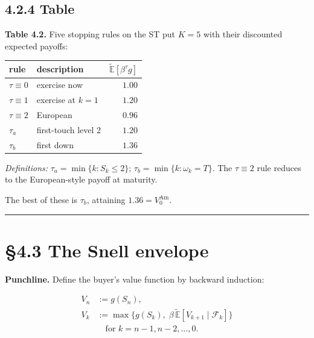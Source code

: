 \documentclass[
  10pt,
  twoside]{book}
\newcounter{none} %
\begin{document}
\subsection{4.2.4 Table}\label{table-17}

\textbf{Table 4.2.} Five stopping rules on the ST put \(K=5\) with their
discounted expected payoffs:

{\def\LTcaptype{none} %
\begin{table}[H]
\centering
\begin{tabular}{|l|l|r|}
\toprule
rule & description & \(\tilde{\mathbb{E}}[\beta^\tau g]\) \\
\midrule



\(\tau \equiv 0\) & exercise now & \(1.00\) \\
\(\tau \equiv 1\) & exercise at \(k=1\) & \(1.20\) \\
\(\tau \equiv 2\) & European & \(0.96\) \\
\(\tau_a\) & first-touch level 2 & \(1.20\) \\
\(\tau_b\) & first down & \textbf{\(1.36\)} \\
\bottomrule
\end{tabular}
\end{table}
}

\emph{Definitions:} \(\tau_a = \min\{k : S_k \le 2\}\);
\(\tau_b = \min\{k : \omega_k = T\}\). The \(\tau \equiv 2\) rule
reduces to the European-style payoff at maturity.

The best of these is \(\tau_b\), attaining \(1.36 = V_0^{\text{Am}}\).

\begin{center}\rule{0.5\linewidth}{0.5pt}\end{center}

\section{§4.3 The Snell envelope}\label{the-snell-envelope}

\textbf{Punchline.} Define the buyer's value function by backward
induction:

\[\boxed{\;\begin{aligned}
V_n &:= g(S_n), \\
V_k &:= \max\!\Big\{g(S_k),\; \beta\, \tilde{\mathbb{E}}[V_{k+1}\mid \mathcal F_k]\Big\}\\
&\quad\text{for } k = n-1, n-2, \dots, 0.
\end{aligned}\;}\]
\end{document}
